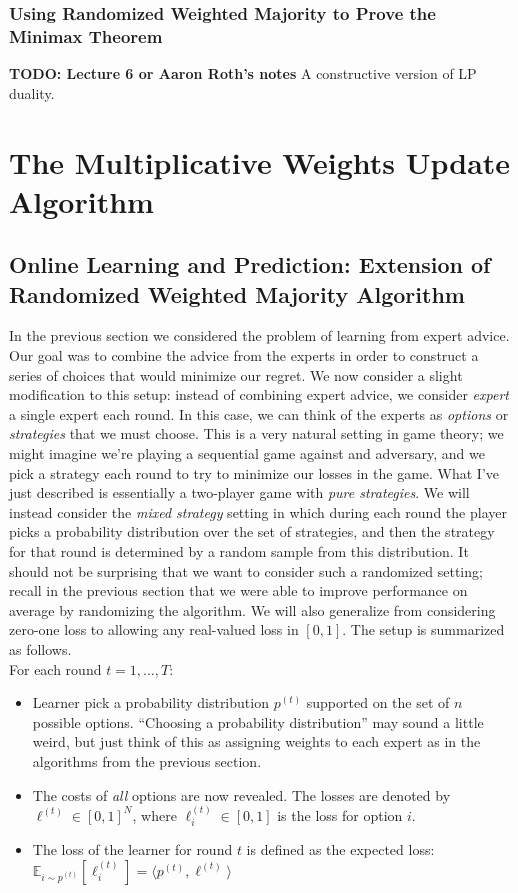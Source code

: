 \documentclass[12pt]{article}
\newcommand{\E}{\mathbb{E}}
\begin{document}
\subsubsection{Using Randomized Weighted Majority to Prove the Minimax Theorem}
\textbf{TODO: Lecture 6 or Aaron Roth's notes}
A constructive version of LP duality. 


\section{The Multiplicative Weights Update Algorithm}


\subsection{Online Learning and Prediction: Extension of Randomized Weighted Majority Algorithm}
In the previous section we considered the problem of learning from expert advice. Our goal was to combine the advice from the experts in order to construct a series of choices that would
minimize our regret. We now consider a slight modification to this setup: instead of combining expert advice, we consider \textit{expert} a single expert each round. In this case, we can think 
of the experts as \textit{options} or \textit{strategies} that we must choose. This is a very natural setting in game theory; we might imagine we're playing a sequential game against and adversary, 
and we pick a strategy each round to try to minimize our losses in the game. What I've just described is essentially a two-player game with \textit{pure strategies}. We will instead consider the 
\textit{mixed strategy} setting in which during each round the player picks a probability distribution over the set of strategies, and then the strategy for that round is determined by a random sample from this 
distribution. It should not be surprising that we want to consider such a randomized setting; recall in the previous section that we were able to improve performance on average by randomizing the algorithm. 
We will also generalize from considering zero-one loss to allowing any real-valued loss in $[0, 1]$. The setup is summarized as follows. \\
For each round $t = 1, \dots, T$:
\begin{itemize}
\item Learner pick a probability distribution $p^{(t)}$ supported on the set of $n$ possible options. ``Choosing a probability distribution'' may sound a little weird, but just think of this as 
assigning weights to each expert as in the algorithms from the previous section. 
\item The costs of \textit{all} options are now revealed. The losses are denoted by $\ell^{(t)} \in [0, 1]^N$, where $\ell^{(t)}_i \in [0, 1]$ is the loss for option $i$. 
\item The loss of the learner for round $t$ is defined as the expected loss: $\E_{i \sim p^{(t)}}[\ell^{(t)}_i] = \langle p^{(t)}, \ell^{(t)}\rangle$
\end{itemize} 
\end{document}

